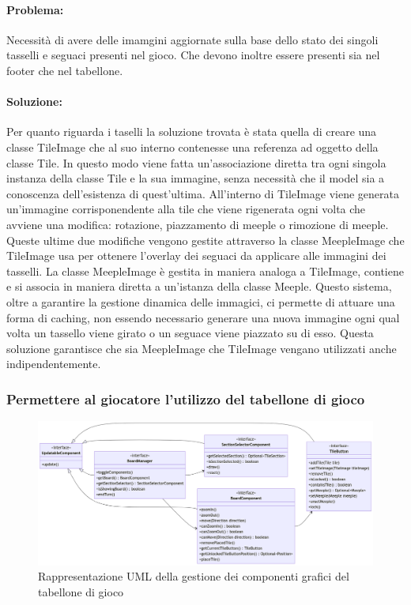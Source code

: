 \paragraph{Problema:}
Necessità di avere delle imamgini aggiornate sulla base dello stato dei singoli tasselli e seguaci presenti nel gioco. Che devono inoltre essere presenti
sia nel footer che nel tabellone.
\paragraph{Soluzione:}
Per quanto riguarda i taselli la soluzione trovata è stata quella di creare una classe TileImage che al suo interno contenesse una referenza ad oggetto della classe Tile. In questo modo viene fatta un'associazione diretta tra ogni singola instanza della classe Tile e la sua immagine, senza necessità che il model sia a conoscenza dell'esistenza di quest'ultima. All'interno di TileImage viene generata un'immagine corrisponendente alla tile che viene rigenerata ogni volta che avviene una modifica: rotazione, piazzamento di meeple o rimozione di meeple. Queste ultime due modifiche vengono gestite attraverso la classe MeepleImage che TileImage usa per ottenere l'overlay dei seguaci da applicare alle immagini dei tasselli. La classe MeepleImage è gestita in maniera analoga a TileImage, contiene e si associa in maniera diretta a un'istanza della classe Meeple. Questo sistema, oltre a garantire la gestione dinamica delle immagici, ci permette di attuare una forma di caching, non essendo necessario generare una nuova immagine ogni qual volta un tassello viene girato o un seguace viene piazzato su di esso. Questa soluzione garantisce che sia MeepleImage che TileImage vengano utilizzati anche indipendentemente.

\subsubsection*{Permettere al giocatore l'utilizzo del tabellone di gioco}
\begin{figure}[h]
    \centering\includegraphics[scale=.3]{images/uml_board.png}
    \caption{Rappresentazione UML della gestione dei componenti grafici del tabellone di gioco}
\end{figure}
